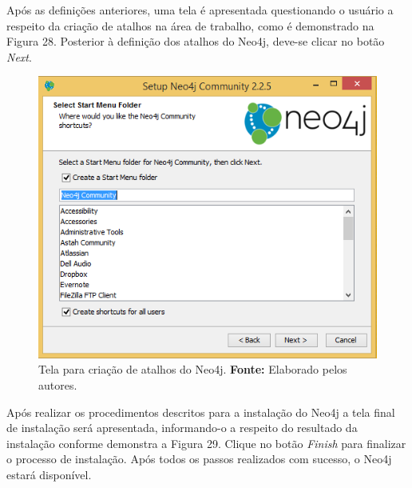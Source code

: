 \par Após as definições anteriores, uma tela é apresentada questionando o usuário a respeito da criação de atalhos na área de trabalho, como é demonstrado na Figura 28. Posterior à definição dos atalhos do Neo4j, deve-se clicar no botão \textit{Next}.

\begin{figure}[h!]
	\centerline{\includegraphics[scale=0.4]{./imagens/neo4j-install-step4.png}}
	\caption[Tela para criação de atalhos do Neo4j]
	{Tela para criação de atalhos do Neo4j. \textbf{Fonte:} Elaborado pelos autores.}
	\label{fig:exemplo1}
\end{figure}

\par Após realizar os procedimentos descritos para a instalação do Neo4j a tela final de instalação será apresentada, informando-o a respeito do resultado da instalação conforme demonstra a Figura 29. Clique no botão \textit{Finish} para finalizar o processo de instalação.
Após todos os passos realizados com sucesso, o Neo4j estará disponível.

